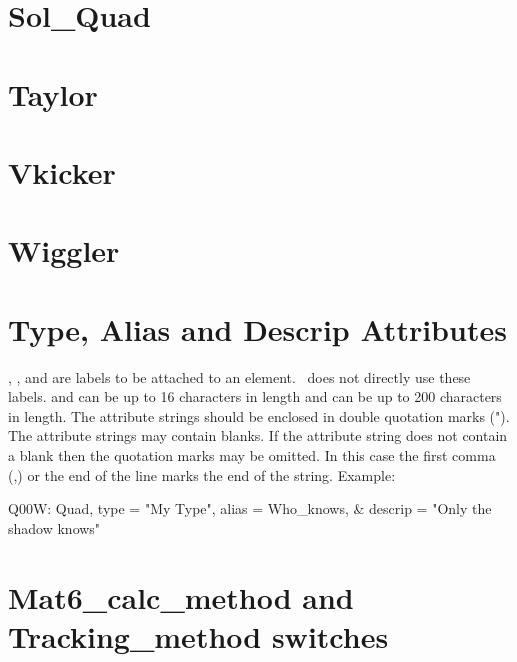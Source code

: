 \section{Sol\_Quad}
\label{s:sq}

\section{Taylor}
\label{s:tay}

\section{Vkicker}
\label{s:vk}

\section{Wiggler} 
\label{s:wig}

\section{Type, Alias and Descrip Attributes}
\label{s:string}

, , and  are labels to be attached 
to an element. \bmad\ does not directly use these labels. 
and  can be up to 16 characters in length and 
can be up to 200 characters in length. The attribute strings should be
enclosed in double quotation marks ("). The attribute strings may
contain blanks. If the attribute string does not contain a blank then
the quotation marks may be omitted. In this case the first comma (,)
or the end of the line marks the end of the string. Example:
\begin{example}
  Q00W: Quad, type = "My Type", alias = Who_knows, &
                                        descrip = "Only the shadow knows"
\end{example}

\section{Mat6\_calc\_method and Tracking\_method switches}
\label{s:track}


